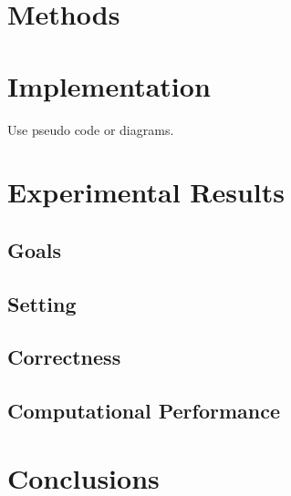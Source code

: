 \documentclass[draft]{article}
\begin{document}
\section{Methods}\label{sec:methods}


\section{Implementation}\label{sec:implementation}

Use pseudo code or diagrams.

\section{Experimental Results}\label{sec:experimental_results}


\subsection{Goals}\label{sec:goals}

\subsection{Setting}\label{sec:setting}

\subsection{Correctness}\label{sec:correctness}

\subsection{Computational Performance}\label{sec:computational_performance}

\section{Conclusions}\label{sec:conclusions}




\end{document}
